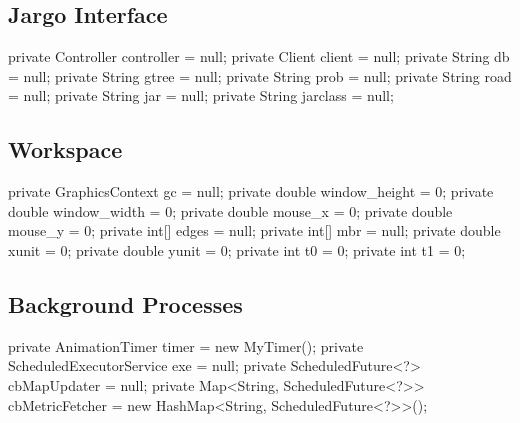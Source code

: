 \subsection{Jargo Interface}
\nwenddocs{}\plusendmoddef
private Controller controller = null;
private Client client = null;
private String db = null;
private String gtree = null;
private String prob = null;
private String road = null;
private String jar = null;
private String jarclass = null;
\nwendcode{}\nwdocspar

\subsection{Workspace}
\nwenddocs{}\plusendmoddef
private GraphicsContext gc = null;
private double window_height = 0;
private double window_width = 0;
private double mouse_x = 0;
private double mouse_y = 0;
private int[] edges = null;
private int[] mbr = null;
private double xunit = 0;
private double yunit = 0;
private int t0 = 0;
private int t1 = 0;
\nwendcode{}\nwdocspar

\subsection{Background Processes}
\nwenddocs{}\plusendmoddef
private AnimationTimer timer = new MyTimer();
private ScheduledExecutorService exe = null;
private ScheduledFuture<?> cbMapUpdater = null;
private Map<String, ScheduledFuture<?>> cbMetricFetcher = new HashMap<String, ScheduledFuture<?>>();
\nwendcode{}\nwdocspar

